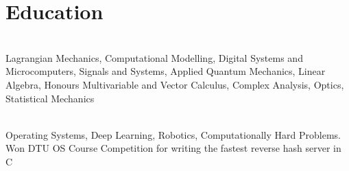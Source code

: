 \documentclass[]{deedy-resume-openfont}
\begin{document}
\vspace{12pt}


\section{Education}

\begin{adjustwidth}{0.55cm}{1.25cm}
	 \\
	 Lagrangian Mechanics, Computational Modelling, Digital Systems and Microcomputers, Signals and Systems, Applied Quantum Mechanics, Linear Algebra, Honours Multivariable and Vector Calculus, Complex Analysis, Optics, Statistical Mechanics
\end{adjustwidth}

\vspace{8pt}

\begin{adjustwidth}{0.55cm}{1.25cm}
	 \\
   Operating Systems, Deep Learning, Robotics, Computationally Hard Problems. \\
	Won DTU OS Course Competition for writing the fastest reverse hash server in C
\end{adjustwidth}

\vspace{10pt}
\end{document}
